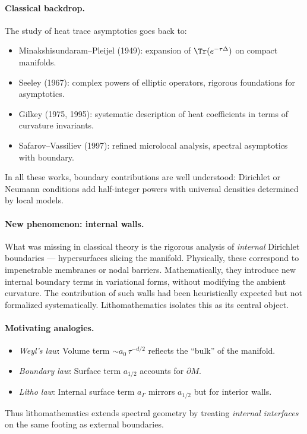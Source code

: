 \paragraph{Classical backdrop.}
The study of heat trace asymptotics goes back to:
\begin{itemize}
  \item Minakshisundaram--Pleijel (1949): expansion of $\Tr(e^{-\tau\Delta})$ on compact manifolds.
  \item Seeley (1967): complex powers of elliptic operators, rigorous foundations for asymptotics.
  \item Gilkey (1975, 1995): systematic description of heat coefficients in terms of curvature invariants.
  \item Safarov--Vassiliev (1997): refined microlocal analysis, spectral asymptotics with boundary.
\end{itemize}
In all these works, boundary contributions are well understood: Dirichlet or Neumann conditions add half-integer powers
with universal densities determined by local models.

\paragraph{New phenomenon: internal walls.}
What was missing in classical theory is the rigorous analysis of \emph{internal} Dirichlet boundaries --- hypersurfaces slicing the manifold.
Physically, these correspond to impenetrable membranes or nodal barriers.
Mathematically, they introduce new internal boundary terms in variational forms, without modifying the ambient curvature.
The contribution of such walls had been heuristically expected but not formalized systematically.
Lithomathematics isolates this as its central object.

\paragraph{Motivating analogies.}
\begin{itemize}
  \item \emph{Weyl’s law}: Volume term $\sim a_0\,\tau^{-d/2}$ reflects the “bulk” of the manifold.
  \item \emph{Boundary law}: Surface term $a_{1/2}$ accounts for $\partial M$.
  \item \emph{Litho law}: Internal surface term $a_\Gamma$ mirrors $a_{1/2}$ but for interior walls.
\end{itemize}
Thus lithomathematics extends spectral geometry by treating \emph{internal interfaces} on the same footing as external boundaries.

